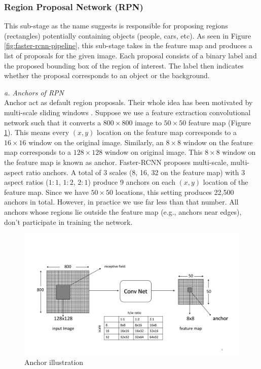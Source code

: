 \vspace{5pt}
\subsubsection{Region Proposal Network (RPN)}
This sub-stage as the name suggests is responsible for proposing regions (rectangles) potentially containing objects (people, cars, etc). As seen in Figure \ref{fig:faster-rcnn-pipeline}, this sub-stage takes in the feature map and produces a list of proposals for the given image. Each proposal consists of a binary label and the proposed bounding box of the region of interest. The label then indicates whether the proposal corresponds to an object or the background. 

\vspace{5pt}
\textit{a. Anchors of RPN}\\
Anchor act as default region proposals. Their whole idea has been motivated by multi-scale sliding windows \cite{ref_fasterrcnn}. Suppose we use a feature extraction convolutional network such that it converts a $800\times800$ image to $50\times50$ feature map (Figure \ref{fig:anchors}). This means every $(x,y)$ location on the feature map corresponds to a $16\times16$ window on the original image. Similarly, an $8\times8$ window on the feature map corresponds to a $128\times128$ window on original image. This $8\times8$ window on the feature map is known as anchor. Faster-RCNN proposes multi-scale, multi-aspect ratio anchors. A total of 3 scales (8, 16, 32 on the feature map) with 3 aspect ratios ($1:1$, $1:2$, $2:1$) produce 9 anchors on each $(x,y)$ location of the feature map. Since we have $50\times50$ locations, this setting produces 22,500 anchors in total. However, in practice we use far less than that number. All anchors whose regions lie outside the feature map (e.g., anchors near edges), don't participate in training the network. 

\begin{figure}
    \centering
    \includegraphics[width=\linewidth,trim={0 60 0 130},clip]{images/anchors}
    \caption[Anchor illustration]{Anchor illustration}
    \label{fig:anchors}
\end{figure}

